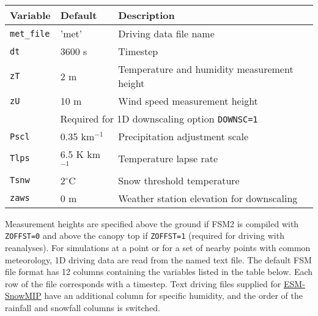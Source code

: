 \documentclass{article}
\begin{document}
\begin{tabular}{|l|l|l|}
\hline
Variable & Default & Description \\
\hline
{\tt met\_file} & 'met'   & Driving data file name                      \\
{\tt dt}        & 3600 s  & Timestep                                    \\
{\tt zT}        & 2 m     & Temperature and humidity measurement height \\
{\tt zU}        & 10 m    & Wind speed measurement height               \\
\hline
\multicolumn{3}{|c|}{Required for 1D downscaling option {\tt DOWNSC=1}} \\
\hline
{\tt Pscl}      & 0.35 km$^{-1}$  & Precipitation adjustment scale      \\
{\tt Tlps}      & 6.5 K km$^{-1}$ & Temperature lapse rate              \\
{\tt Tsnw}      & 2$^\circ$C      & Snow threshold temperature          \\
{\tt zaws}      & 0 m     & Weather station elevation for downscaling   \\
\hline 
\end{tabular}

Measurement heights are specified above the ground if FSM2 is compiled with {\tt ZOFFST=0} and above the canopy top if {\tt ZOFFST=1} (required for driving with reanalyses). For simulations at a point or for a set of nearby points with common meteorology, 1D driving data are read from the named text file. The default FSM file format has 12 columns containing the variables listed in the table below. Each row of the file corresponds with a timestep. Text driving files supplied for \href{https://www.geos.ed.ac.uk/~ressery/ESM-SnowMIP/ESMSnowMIP_Reference_sites.pdf}{ESM-SnowMIP} have an additional column for specific humidity, and the order of the rainfall and snowfall columns is switched.
\end{document}
